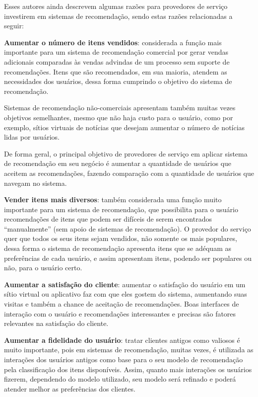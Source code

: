 Esses autores ainda descrevem algumas razões para provedores de serviço investirem em sistemas de recomendação, sendo estas razões relacionadas a seguir:

\textbf{Aumentar o número de itens vendidos}: considerada a função mais importante para um sistema de recomendação comercial por gerar vendas adicionais comparadas às vendas advindas de um processo sem suporte de recomendações. Itens que são recomendados, em sua maioria, atendem as necessidades dos usuários, dessa forma cumprindo o objetivo do sistema de recomendação.

Sistemas de recomendação não-comerciais apresentam também muitas vezes objetivos semelhantes, mesmo que não haja custo para o usuário, como por exemplo, sítios virtuais de notícias que desejam aumentar o número de notícias lidas por usuários.

De forma geral, o principal objetivo de provedores de serviço em aplicar sistema de recomendação em seu negócio é aumentar a quantidade de usuários que aceitem as recomendações, fazendo comparação com a quantidade de usuários que navegam no sistema.

\textbf{Vender itens mais diversos}: também considerada uma função muito importante para um sistema de recomendação, que possibilita para o usuário recomendações de itens que podem ser difíceis de serem encontrados “manualmente” (sem apoio de sistemas de recomendação). O provedor do serviço quer que todos os seus itens sejam vendidos, não somente os mais populares, dessa forma o sistema de recomendação apresenta itens que se adéquam as preferências de cada usuário, e assim apresentam itens, podendo ser populares ou não, para o usuário certo.

\textbf{Aumentar a satisfação do cliente}: aumentar o satisfação do usuário em um sítio virtual ou aplicativo faz com que eles gostem do sistema, aumentando suas visitas e também a chance de aceitação de recomendações. Boas interfaces de interação com o usuário e recomendações interessantes e precisas são fatores relevantes na satisfação do cliente.

\textbf{Aumentar a fidelidade do usuário}: tratar clientes antigos como valiosos é muito importante, pois em sistemas de recomendação, muitas vezes, é utilizada as interações dos usuários antigos como base para o seu modelo de recomendação pela classificação dos itens disponíveis. Assim, quanto mais interações os usuários fizerem, dependendo do modelo utilizado, seu modelo será refinado e poderá atender melhor as preferências dos clientes.

